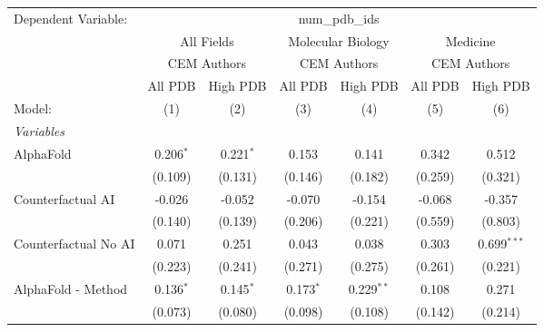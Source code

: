 \begingroup
\centering
\begin{tabular}{lcccccc}
   \tabularnewline \midrule \midrule
   Dependent Variable: & \multicolumn{6}{c}{num\_pdb\_ids}\\
 & \multicolumn{2}{c}{All Fields} & \multicolumn{2}{c}{Molecular Biology} & \multicolumn{2}{c}{Medicine} \\
\cmidrule(lr){2-3} \cmidrule(lr){4-5} \cmidrule(lr){6-7}
 & \multicolumn{2}{c}{CEM Authors} & \multicolumn{2}{c}{CEM Authors} & \multicolumn{2}{c}{CEM Authors} \\
\cmidrule(lr){2-3} \cmidrule(lr){4-5} \cmidrule(lr){6-7}
 & \multicolumn{1}{c}{All PDB} & \multicolumn{1}{c}{High PDB} & \multicolumn{1}{c}{All PDB} & \multicolumn{1}{c}{High PDB} & \multicolumn{1}{c}{All PDB} & \multicolumn{1}{c}{High PDB} \\
\cmidrule(lr){2-2} \cmidrule(lr){3-3} \cmidrule(lr){4-4} \cmidrule(lr){5-5} \cmidrule(lr){6-6} \cmidrule(lr){7-7}
   Model:                                                     & (1)          & (2)          & (3)          & (4)          & (5)     & (6)\\  
   \midrule
   \emph{Variables}\\
   AlphaFold                                                  & 0.206$^{*}$  & 0.221$^{*}$  & 0.153        & 0.141        & 0.342   & 0.512\\   
                                                              & (0.109)      & (0.131)      & (0.146)      & (0.182)      & (0.259) & (0.321)\\   
   Counterfactual AI                                          & -0.026       & -0.052       & -0.070       & -0.154       & -0.068  & -0.357\\   
                                                              & (0.140)      & (0.139)      & (0.206)      & (0.221)      & (0.559) & (0.803)\\   
   Counterfactual No AI                                       & 0.071        & 0.251        & 0.043        & 0.038        & 0.303   & 0.699$^{***}$\\   
                                                              & (0.223)      & (0.241)      & (0.271)      & (0.275)      & (0.261) & (0.221)\\   
   AlphaFold - Method                                         & 0.136$^{*}$  & 0.145$^{*}$  & 0.173$^{*}$  & 0.229$^{**}$ & 0.108   & 0.271\\   
                                                              & (0.073)      & (0.080)      & (0.098)      & (0.108)      & (0.142) & (0.214)\\   

\end{tabular}

